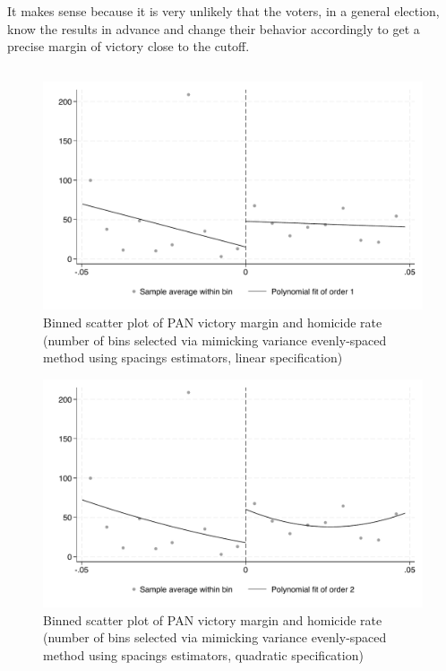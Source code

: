 \documentclass{article}
\begin{document}
It makes sense because it is very unlikely that the voters, in a general election, know the results in advance and change their behavior accordingly to get a precise margin of victory close to the cutoff.


\subsection{}

\begin{figure}[H]
    \centering
    \includegraphics[scale=0.5]{../outputs/binned_scatter_esmv_linear_plot.pdf}
    \caption{Binned scatter plot of PAN victory margin and homicide rate (number of bins selected via mimicking variance evenly-spaced method using spacings estimators, linear specification)}
    \label{fig:binned_scatter_esmv_linear}
\end{figure}

\begin{figure}[H]
    \centering
    \includegraphics[scale=0.5]{../outputs/binned_scatter_esmv_quadratic_plot.pdf}
    \caption{Binned scatter plot of PAN victory margin and homicide rate (number of bins selected via mimicking variance evenly-spaced method using spacings estimators, quadratic specification)}
    \label{fig:binned_scatter_esmv_quadratic}
\end{figure}
\end{document}
